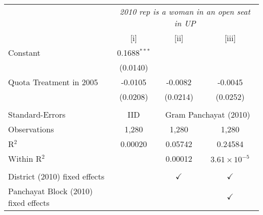 
\begingroup
\centering
\begin{tabular}{lccc}
   \toprule
    & \multicolumn{3}{c}{\textit{2010 rep is a woman in an open seat in UP}}\\
                                        & [i]            & [ii]          & [iii]\\  
   \midrule 
   Constant                             & 0.1688$^{***}$ &               &   \\   
                                        & (0.0140)       &               &   \\   
   Quota Treatment in 2005              & -0.0105        & -0.0082       & -0.0045\\   
                                        & (0.0208)       & (0.0214)      & (0.0252)\\   
    \\
   Standard-Errors & IID & \multicolumn{2}{c}{Gram Panchayat (2010)} \\ 
   Observations                         & 1,280          & 1,280         & 1,280\\  
   R$^2$                                & 0.00020        & 0.05742       & 0.24584\\  
   Within R$^2$                         &                & 0.00012       & $3.61\times 10^{-5}$\\   
    \\
   District (2010) fixed effects        &                & $\checkmark$  & $\checkmark$\\   
   Panchayat Block (2010) fixed effects &                &               & $\checkmark$\\   
   \bottomrule
\end{tabular}
\par\endgroup


